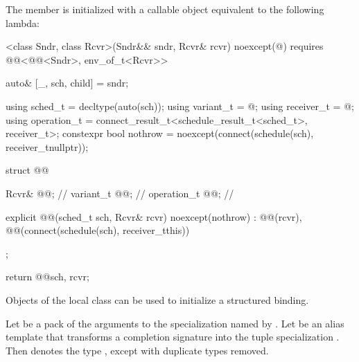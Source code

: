 \pnum
The member 
is initialized with a callable object equivalent to the following lambda:
\begin{codeblock}
[]<class Sndr, class Rcvr>(Sndr&& sndr, Rcvr& rcvr) noexcept(@\seebelow@)
    requires @@<@@<Sndr>, env_of_t<Rcvr>> {

  auto& [_, sch, child] = sndr;

  using sched_t = decltype(auto(sch));
  using variant_t = @\seebelow@;
  using receiver_t = @\seebelow@;
  using operation_t = connect_result_t<schedule_result_t<sched_t>, receiver_t>;
  constexpr bool nothrow = noexcept(connect(schedule(sch), receiver_t{nullptr}));

  struct @@ {
    Rcvr& @@;                 // \expos
    variant_t @@;     // \expos
    operation_t @@;       // \expos

    explicit @@(sched_t sch, Rcvr& rcvr) noexcept(nothrow)
      : @@(rcvr), @@(connect(schedule(sch), receiver_t{this})) {}
  };

  return @@{sch, rcvr};
}
\end{codeblock}

\pnum
Objects of the local class  can be used
to initialize a structured binding.

\pnum
Let  be
a pack of the arguments to the  specialization
named by .
Let  be an alias template
that transforms a completion signature  into
the tuple specialization .
Then  denotes
the type ,
except with duplicate types removed.

